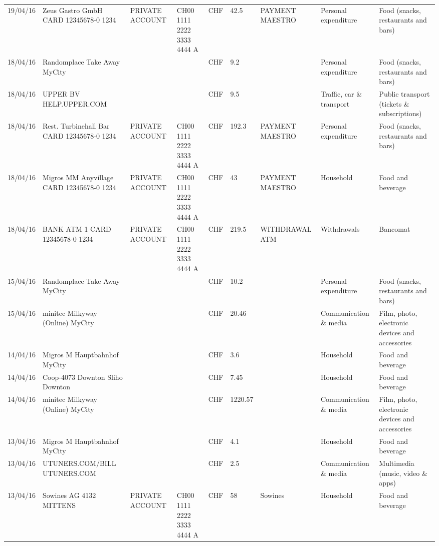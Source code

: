 \begin{landscape}
\begin{center}
\begin{longtable}{lllllllll}
		19/04/16 & Zeus Gastro GmbH CARD 12345678-0 1234 & PRIVATE ACCOUNT & CH00 1111 2222 3333 4444 A & CHF   & 42.5  & PAYMENT MAESTRO & Personal expenditure & Food (snacks, restaurants and bars) \\
		18/04/16 & Randomplace Take Away     MyCity &       &       & CHF   & 9.2   &       & Personal expenditure & Food (snacks, restaurants and bars) \\
		18/04/16 & UPPER BV                  HELP.UPPER.COM &       &       & CHF   & 9.5   &       & Traffic, car \& transport & Public transport (tickets \& subscriptions) \\
		18/04/16 & Rest. Turbinehall Bar CARD 12345678-0 1234 & PRIVATE ACCOUNT & CH00 1111 2222 3333 4444 A & CHF   & 192.3 & PAYMENT MAESTRO & Personal expenditure & Food (snacks, restaurants and bars) \\
		18/04/16 & Migros MM Anyvillage CARD 12345678-0 1234 & PRIVATE ACCOUNT & CH00 1111 2222 3333 4444 A & CHF   & 43    & PAYMENT MAESTRO & Household & Food and beverage \\
		18/04/16 & BANK ATM 1 CARD 12345678-0 1234 & PRIVATE ACCOUNT & CH00 1111 2222 3333 4444 A & CHF   & 219.5 & WITHDRAWAL ATM & Withdrawals & Bancomat \\
		15/04/16 & Randomplace Take Away     MyCity &       &       & CHF   & 10.2  &       & Personal expenditure & Food (snacks, restaurants and bars) \\
		15/04/16 & minitec Milkyway (Online) MyCity &       &       & CHF   & 20.46 &       & Communication \& media & Film, photo, electronic devices and accessories \\
		14/04/16 & Migros M Hauptbahnhof    MyCity &       &       & CHF   & 3.6   &       & Household & Food and beverage \\
		14/04/16 & Coop-4073 Downton Sliho   Downton &       &       & CHF   & 7.45  &       & Household & Food and beverage \\
		14/04/16 & minitec Milkyway (Online) MyCity &       &       & CHF   & 1220.57 &       & Communication \& media & Film, photo, electronic devices and accessories \\
		13/04/16 & Migros M Hauptbahnhof    MyCity &       &       & CHF   & 4.1   &       & Household & Food and beverage \\
		13/04/16 & UTUNERS.COM/BILL          UTUNERS.COM &       &       & CHF   & 2.5   &       & Communication \& media & Multimedia (music, video \& apps) \\
		13/04/16 & Sowines AG 4132 MITTENS & PRIVATE ACCOUNT & CH00 1111 2222 3333 4444 A & CHF   & 58    & Sowines & Household & Food and beverage \\

\end{longtable}
\end{center}
\end{landscape}
